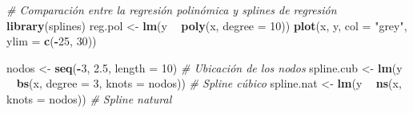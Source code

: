 \documentclass[
]{book}
\newenvironment{Shaded}{\begin{snugshade}}{\end{snugshade}}
\newcommand{\CommentTok}[1]{\textcolor[rgb]{0.56,0.35,0.01}{\textit{#1}}}
\newcommand{\DataTypeTok}[1]{\textcolor[rgb]{0.13,0.29,0.53}{#1}}
\newcommand{\DecValTok}[1]{\textcolor[rgb]{0.00,0.00,0.81}{#1}}
\newcommand{\FloatTok}[1]{\textcolor[rgb]{0.00,0.00,0.81}{#1}}
\newcommand{\KeywordTok}[1]{\textcolor[rgb]{0.13,0.29,0.53}{\textbf{#1}}}
\newcommand{\NormalTok}[1]{#1}
\newcommand{\OperatorTok}[1]{\textcolor[rgb]{0.81,0.36,0.00}{\textbf{#1}}}
\newcommand{\StringTok}[1]{\textcolor[rgb]{0.31,0.60,0.02}{#1}}
\begin{document}
\begin{Shaded}
\begin{Highlighting}[]
\CommentTok{# Comparación entre la regresión polinómica y splines de regresión}
\KeywordTok{library}\NormalTok{(splines)}
\NormalTok{reg.pol <-}\StringTok{ }\KeywordTok{lm}\NormalTok{(y }\OperatorTok{~}\StringTok{ }\KeywordTok{poly}\NormalTok{(x, }\DataTypeTok{degree =} \DecValTok{10}\NormalTok{))}
\KeywordTok{plot}\NormalTok{(x, y, }\DataTypeTok{col =} \StringTok{"grey"}\NormalTok{, }\DataTypeTok{ylim =} \KeywordTok{c}\NormalTok{(}\OperatorTok{-}\DecValTok{25}\NormalTok{, }\DecValTok{30}\NormalTok{))}

\NormalTok{nodos <-}\StringTok{ }\KeywordTok{seq}\NormalTok{(}\OperatorTok{-}\DecValTok{3}\NormalTok{, }\FloatTok{2.5}\NormalTok{, }\DataTypeTok{length =} \DecValTok{10}\NormalTok{) }\CommentTok{# Ubicación de los nodos}
\NormalTok{spline.cub <-}\StringTok{ }\KeywordTok{lm}\NormalTok{(y }\OperatorTok{~}\StringTok{ }\KeywordTok{bs}\NormalTok{(x, }\DataTypeTok{degree =} \DecValTok{3}\NormalTok{, }\DataTypeTok{knots =}\NormalTok{ nodos)) }\CommentTok{# Spline cúbico}
\NormalTok{spline.nat <-}\StringTok{ }\KeywordTok{lm}\NormalTok{(y }\OperatorTok{~}\StringTok{ }\KeywordTok{ns}\NormalTok{(x, }\DataTypeTok{knots =}\NormalTok{ nodos)) }\CommentTok{# Spline natural}


\end{Highlighting}
\end{Shaded}
\end{document}
